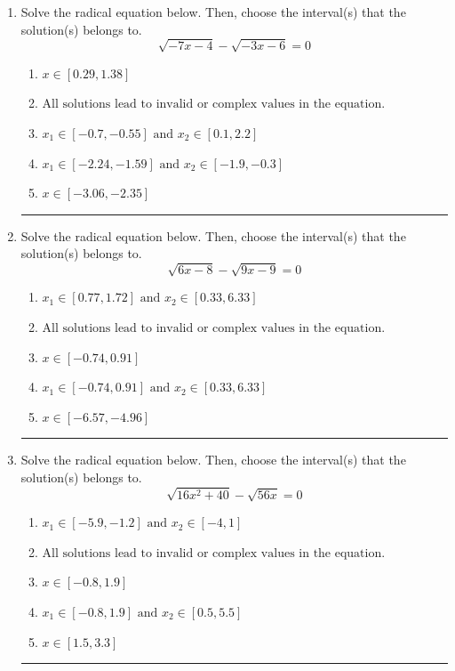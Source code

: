 \documentclass[14pt]{extbook}
\newcommand{\litem}[1]{\item#1\hspace*{-1cm}\rule{\textwidth}{0.4pt}}
\begin{document}
\begin{enumerate}
{\begin{enumerate}[label=\Alph*.]
\end{enumerate} }
\litem{
Solve the radical equation below. Then, choose the interval(s) that the solution(s) belongs to.\[ \sqrt{-7 x - 4} - \sqrt{-3 x - 6} = 0 \]\begin{enumerate}[label=\Alph*.]
\item \( x \in [0.29,1.38] \)
\item \( \text{All solutions lead to invalid or complex values in the equation.} \)
\item \( x_1 \in [-0.7, -0.55] \text{ and } x_2 \in [0.1,2.2] \)
\item \( x_1 \in [-2.24, -1.59] \text{ and } x_2 \in [-1.9,-0.3] \)
\item \( x \in [-3.06,-2.35] \)

\end{enumerate} }
\litem{
Solve the radical equation below. Then, choose the interval(s) that the solution(s) belongs to.\[ \sqrt{6 x - 8} - \sqrt{9 x - 9} = 0 \]\begin{enumerate}[label=\Alph*.]
\item \( x_1 \in [0.77, 1.72] \text{ and } x_2 \in [0.33,6.33] \)
\item \( \text{All solutions lead to invalid or complex values in the equation.} \)
\item \( x \in [-0.74,0.91] \)
\item \( x_1 \in [-0.74, 0.91] \text{ and } x_2 \in [0.33,6.33] \)
\item \( x \in [-6.57,-4.96] \)

\end{enumerate} }
\litem{
Solve the radical equation below. Then, choose the interval(s) that the solution(s) belongs to.\[ \sqrt{16 x^2 + 40} - \sqrt{56 x} = 0 \]\begin{enumerate}[label=\Alph*.]
\item \( x_1 \in [-5.9, -1.2] \text{ and } x_2 \in [-4,1] \)
\item \( \text{All solutions lead to invalid or complex values in the equation.} \)
\item \( x \in [-0.8,1.9] \)
\item \( x_1 \in [-0.8, 1.9] \text{ and } x_2 \in [0.5,5.5] \)
\item \( x \in [1.5,3.3] \)

\end{enumerate} }
\end{enumerate}
\end{document}
